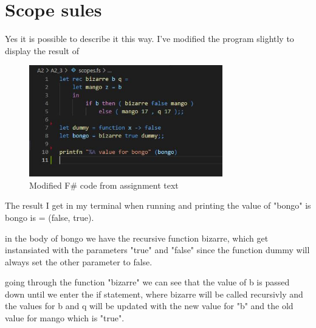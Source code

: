 \section{Scope sules}

Yes it is possible to describe it this way. I've modified the program slightly to display the result
of 
\begin{figure}[H]
    \centering
    \includegraphics[width=0.75\textwidth]{Figures/Scope_rules.JPG}
    \caption{Modified F\# code from assignment text}
\end{figure}

The result I get in my terminal when running and printing the value of "bongo"
is bongo is = (false, true).

in the body of bongo we have the recursive function bizarre, which get
instansiated with the parameters "true" and "false" since the function dummy
will always set the other parameter to false.

going through the function "bizarre" we can see that the value of b is passed down
until we enter the if statement, where bizarre will be called recursivly and the values
for b and q will be updated with the new value for "b" and the old value for mango which is
"true".